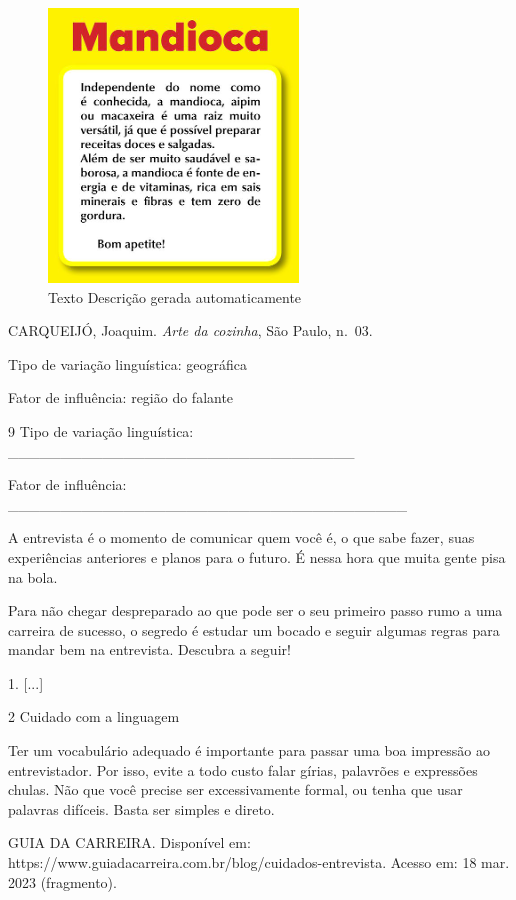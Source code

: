 \begin{figure}
\centering
\includegraphics[width=2.61458in,height=2.86458in]{./imgSAEB_8_POR/media/image26.png}
\caption{Texto Descrição gerada automaticamente}
\end{figure}

CARQUEIJÓ, Joaquim. \emph{Arte da cozinha}, São Paulo, n.~03.

Tipo de variação linguística: geográfica

Fator de influência: região do falante

\num{9} Tipo de variação linguística:
\_\_\_\_\_\_\_\_\_\_\_\_\_\_\_\_\_\_\_\_\_\_\_\_\_\_\_\_\_\_\_\_\_

Fator de influência:
\_\_\_\_\_\_\_\_\_\_\_\_\_\_\_\_\_\_\_\_\_\_\_\_\_\_\_\_\_\_\_\_\_\_\_\_\_\_

A entrevista é o momento de comunicar quem você é, o que sabe fazer,
suas experiências anteriores e planos para o futuro. É nessa hora que
muita gente pisa na bola.

Para não chegar despreparado ao que pode ser o seu primeiro passo rumo a
uma carreira de sucesso, o segredo é estudar um bocado e seguir algumas
regras para mandar bem na entrevista. Descubra a seguir!

1. {[}...{]}

\num{2} Cuidado com a linguagem

Ter um vocabulário adequado é importante para passar uma boa impressão
ao entrevistador. Por isso, evite a todo custo falar gírias, palavrões e
expressões chulas. Não que você precise ser excessivamente formal, ou
tenha que usar palavras difíceis. Basta ser simples e direto.

GUIA DA CARREIRA. Disponível em:
https://www.guiadacarreira.com.br/blog/cuidados-entrevista. Acesso em:
18 mar. 2023 (fragmento).

